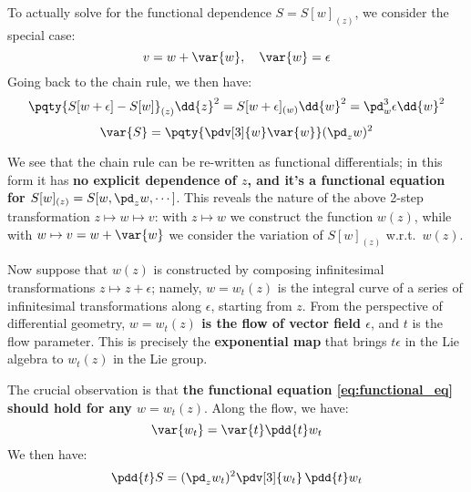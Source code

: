\documentclass[a4paper
	,10pt
]{article}
\begin{document}
	To actually solve for the functional dependence $S = S[w]_{(z)}$, we consider the special case:
	\begin{equation}
		v = w + \var{w},
	\quad \var{w} = \epsilon
	\end{equation}
	Going back to the chain rule, we then have:
	\begin{equation}
		\pqty{S[w + \epsilon] - S[w]}_{(z)} \dd{z}^2
		= S[w + \epsilon]_{(w)} \dd{w}^2
		= \pd_w^3 \epsilon \dd{w}^2
	\end{equation}
	\vspace{-.8\baselineskip}
	\begin{equation}
		\var{S}
		= \pqty{\pdv[3]{w} \var{w}} (\pd_z w)^2
	\label{eq:functional_eq}
	\end{equation}
	
	We see that the chain rule can be re-written as functional differentials; in this form it has \textbf{no explicit dependence of $z$, and it's a functional equation for $
		S[w]_{(z)} = S[w,\pd_z w,\cdots]
	$}. This reveals the nature of the above 2-step transformation $z\mapsto w\mapsto v$: with $z\mapsto w$ we construct the function $w(z)$, while with $w\mapsto v = w + \var{w}$ we consider the variation of $S[w]_{(z)}$ w.r.t.~$w(z)$. 
	
	\newparagraph
	Now suppose that $w(z)$ is constructed by composing infinitesimal transformations $z\mapsto z + \epsilon$; namely, $w = w_t(z)$ is the integral curve of a series of infinitesimal transformations along $\epsilon$, starting from $z$. From the perspective of differential geometry, \textbf{$w = w_t(z)$ is the flow of vector field $\epsilon$}, and $t$ is the flow parameter. This is precisely the \textbf{exponential map} that brings $t\epsilon$ in the Lie algebra to $w_t(z)$ in the Lie group. 
	
	The crucial observation is that \textbf{the functional equation \eqref{eq:functional_eq} should hold for any $w = w_t(z)$}. Along the flow, we have:
	\begin{equation}
		\var{w_t} = \var{t} \pdd{t} w_t
	\end{equation}
	We then have:
	\begin{equation}
		\pdd{t} S
		= (\pd_z w_t)^2
			\pdv[3]{w_t}\,\pdd{t} w_t
	\end{equation}
	
\end{document}
